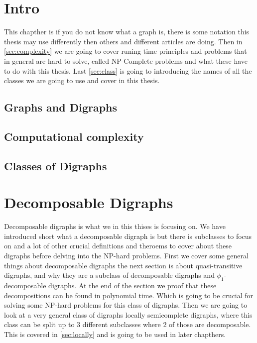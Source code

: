 
\chapter{Intro}
This chapther is if you do not know what a graph is, there is some notation this thesis may use differently then others and different articles are doing.  
Then in \autoref{sec:complexity} we are going to cover runing time principles and problems that in general are hard to solve, called NP-Complete problems and what these have to do with this thesis. Last \autoref{sec:class} is going to introducing the names of all the classes we are going to use and cover in this thesis.
\label{chap:intro}
\section{Graphs and Digraphs}
\label{sec:digraph}

\section{Computational complexity}
\label{sec:complexity}

\section{Classes of Digraphs}
\label{sec:class}


\chapter{Decomposable Digraphs}
\label{chap:decomposable}
Decomposable digraphs is what we in this thises is focusing on. 
We have introduced short what a decomposable digraph is but there is subclasses to focus on and a lot of other crucial definitions and theroems to cover about these digraphs before delving into the NP-hard problems. First we cover some general things about decomposable digraphs the next section is about quasi-transitive digraphs, and why they are a subclass of decomposable digraphs and $\phi_1$-decomposable digraphs. At the end of the section we proof that these decompositions can be found in polynomial time. Which is going to be crucial for solving some NP-hard problems for this class of digraphs. Then we are going to look at a very general class of digraphs locally semicomplete digraphs, where this class can be split up to 3 different subclasses where 2 of those are decomposable. This is covered in \autoref{sec:locally} and is going to be used in later chapthers. 
